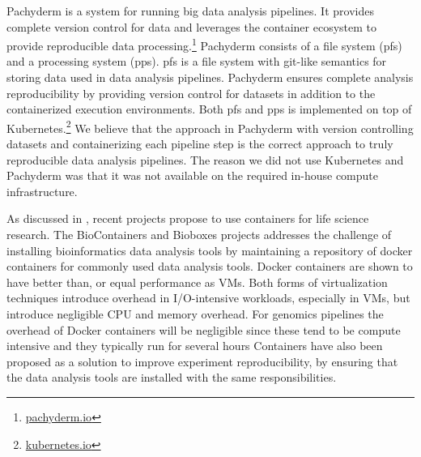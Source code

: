 Pachyderm is a system for running  big data analysis pipelines. It provides
complete version control for data and leverages the container ecosystem to
provide reproducible data processing.\footnote{\url{pachyderm.io}} Pachyderm
consists of a file system (\gls{pfs}) and a processing system (\gls{pps}).
\gls{pfs} is a file system with git-like semantics for storing data used
in data analysis pipelines. Pachyderm ensures complete analysis reproducibility
by providing version control for datasets in addition to the containerized
execution environments. Both \gls{pfs} and \gls{pps} is implemented on top
of Kubernetes.\footnote{\url{kubernetes.io}} We believe that the approach in
Pachyderm with version controlling datasets and containerizing each pipeline
step is the correct approach to truly reproducible data analysis pipelines. 
The reason we did not use Kubernetes and Pachyderm was that it was not available
on the required in-house compute infrastructure.  

As discussed in \cite{NIK}, recent projects propose to use containers for life
science research. The BioContainers\cite{biocontainers} and
Bioboxes\cite{belmann2015bioboxes} projects addresses the challenge of
installing bioinformatics data analysis tools by maintaining a repository of
docker containers for commonly used data analysis tools.  
Docker containers are shown to have better than, or equal performance as
VMs.\cite{di2015impact} Both forms of virtualization techniques introduce
overhead in I/O-intensive workloads, especially in VMs, but introduce negligible
CPU and memory overhead.  For genomics pipelines the overhead of Docker
containers will be negligible since these tend to be compute intensive and they
typically run for several hours \cite{di2015impact}
Containers have also been proposed as a solution to improve experiment
reproducibility, by ensuring that the data analysis tools are installed with
the same responsibilities.\cite{boettiger2015introduction} 



